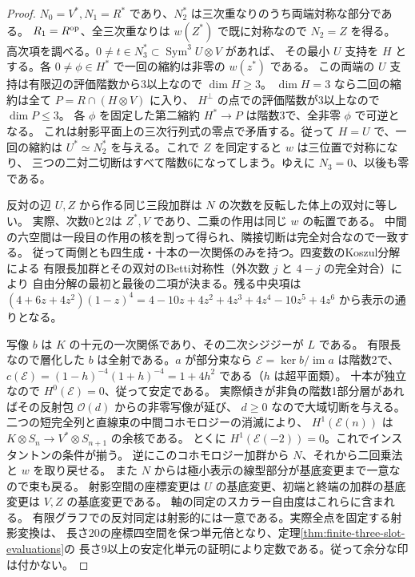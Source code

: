 \begin{proof}
$N_0=V^*, N_1=R^*$ であり、$N_2^*$ は三次重なりのうち両端対称な部分である。
$R_1=R^{\rm op}$、全三次重なりは $w(Z^*)$ で既に対称なので $N_2=Z$ を得る。
高次項を調べる。$0\ne t\in N_3^*\subset\operatorname{Sym}^3 U\otimes V$ があれば、
その最小 $U$ 支持を $H$ とする。各 $0\ne\phi\in H^*$ で一回の縮約は非零の $w(z^*)$ である。
この両端の $U$ 支持は有限辺の評価階数から3以上なので $\dim H\ge3$。
$\dim H=3$ なら二回の縮約は全て $P=R\cap(H\otimes V)$ に入り、
$H^\perp$ の点での評価階数が3以上なので $\dim P\le3$。
各 $\phi$ を固定した第二縮約 $H^*\to P$ は階数3で、全非零 $\phi$ で可逆となる。
これは射影平面上の三次行列式の零点で矛盾する。従って $H=U$ で、一回の縮約は
$U^*\simeq N_2^*$ を与える。これで $Z$ を同定すると $w$ は三位置で対称になり、
三つの二対二切断はすべて階数6になってしまう。ゆえに $N_3=0$、以後も零である。

反対の辺 $U,Z$ から作る同じ三段加群は $N$ の次数を反転した体上の双対に等しい。
実際、次数0と2は $Z^*,V$ であり、二乗の作用は同じ $w$ の転置である。
中間の六空間は一段目の作用の核を割って得られ、隣接切断は完全対合なので一致する。
従って両側とも四生成・十本の一次関係のみを持つ。四変数のKoszul分解による
有限長加群とその双対のBetti対称性（外次数 $j$ と $4-j$ の完全対合）により
自由分解の最初と最後の二項が決まる。残る中央項は
$(4+6z+4z^2)(1-z)^4=4-10z+4z^2+4z^3+4z^4-10z^5+4z^6$
から表示の通りとなる。

写像 $b$ は $K$ の十元の一次関係であり、その二次シジジーが $L$ である。
有限長なので層化した $b$ は全射である。$a$ が部分束なら
$\mathcal E=\ker b/\operatorname{im}a$ は階数2で、
$c(\mathcal E)=(1-h)^{-4}(1+h)^{-4}=1+4h^2$ である（$h$ は超平面類）。
十本が独立なので $H^0(\mathcal E)=0$、従って安定である。
実際傾きが非負の階数1部分層があればその反射包 $\mathcal O(d)$ からの非零写像が延び、
$d\ge0$ なので大域切断を与える。二つの短完全列と直線束の中間コホモロジーの消滅により、
$H^1(\mathcal E(n))$ は $K\otimes S_n\to V^*\otimes S_{n+1}$ の余核である。
とくに $H^1(\mathcal E(-2))=0$。これでインスタントンの条件が揃う。
逆にこのコホモロジー加群から $N$、それから二回乗法と $w$ を取り戻せる。
また $N$ からは極小表示の線型部分が基底変更まで一意なので束も戻る。
射影空間の座標変更は $U$ の基底変更、初端と終端の加群の基底変更は $V,Z$ の基底変更である。
軸の同定のスカラー自由度はこれらに含まれる。
有限グラフでの反対同定は射影的には一意である。実際全点を固定する射影変換は、
長さ20の座標四空間を保つ単元倍となり、定理\ref{thm:finite-three-slot-evaluations}の
長さ9以上の安定化単元の証明により定数である。従って余分な印は付かない。
\end{proof}

